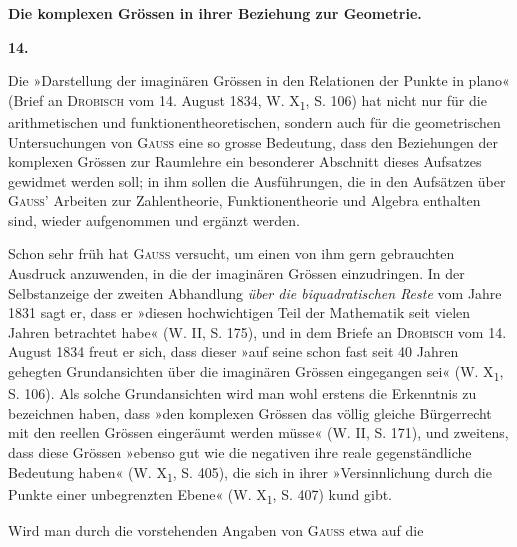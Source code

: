 \clearpage\begingroup{}
\renewcommand{\thefootnote}{\arabic{footnote})}\setcounter{footnote}{1}
\begin{center}
\par\medskip
\textbf{Die komplexen Grössen in ihrer Beziehung zur Geometrie.}\par\medskip
\textbf{14.}\par\smallskip
{}
\end{center}
\noindent\hspace*{\parindent}Die »Darstellung der imaginären Grössen in den Relationen der Punkte
in plano« (Brief an \textsc{Drobisch} vom 14. August 1834, W. X\textsubscript{1}, S. 106) hat nicht
nur für die arithmetischen und funktionentheoretischen, sondern auch für die
geometrischen Untersuchungen von \textsc{Gauss} eine so grosse Bedeutung, dass den
Beziehungen der komplexen Grössen zur Raumlehre ein besonderer Abschnitt
dieses Aufsatzes gewidmet werden soll; in ihm sollen die Ausführungen, die
in den Aufsätzen über \textsc{Gauss}’ Arbeiten zur Zahlentheorie, Funktionentheorie
und Algebra enthalten sind, wieder aufgenommen und ergänzt werden.
\par
Schon sehr früh hat \textsc{Gauss} versucht, um einen von ihm gern gebrauchten
Ausdruck anzuwenden, in die  der imaginären Grössen einzudringen.
In der Selbstanzeige der zweiten Abhandlung \textit{über die biquadratischen Reste}
vom Jahre 1831 sagt er, dass er »diesen hochwichtigen Teil der Mathematik
seit vielen Jahren betrachtet habe« (W. II, S. 175), und in dem Briefe an
\textsc{Drobisch} vom 14. August 1834 freut er sich, dass dieser »auf seine schon fast
\clearpage{}\setcounter{footnote}{0}
\noindent seit 40 Jahren gehegten Grundansichten über die imaginären Grössen eingegangen
sei« (W. X\textsubscript{1}, S. 106). Als solche Grundansichten wird man wohl
erstens die Erkenntnis zu bezeichnen haben, dass »den komplexen Grössen
das völlig gleiche Bürgerrecht mit den reellen Grössen eingeräumt werden
müsse« (W. II, S. 171), und zweitens, dass diese Grössen »ebenso gut wie die
negativen ihre reale gegenständliche Bedeutung haben« (W. X\textsubscript{1}, S. 405), die
sich in ihrer »Versinnlichung durch die Punkte einer unbegrenzten Ebene«
(W. X\textsubscript{1}, S. 407) kund gibt.
\par
Wird man durch die vorstehenden Angaben von \textsc{Gauss} etwa auf die
